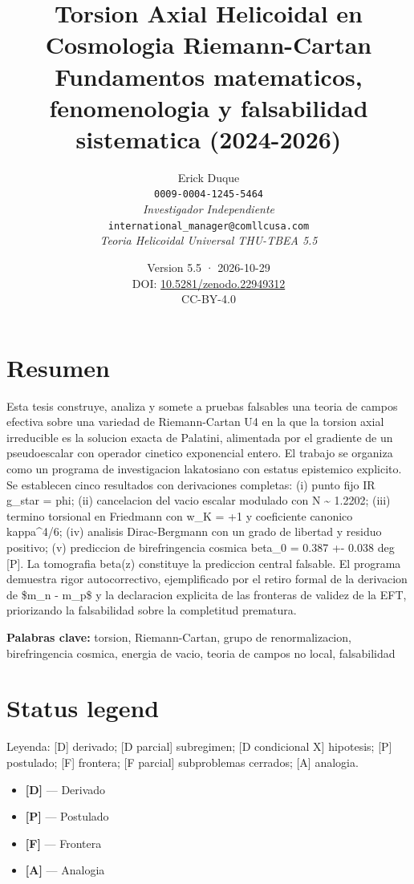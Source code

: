 ﻿\documentclass[11pt,letterpaper]{article}
\title{\textbf{Torsion Axial Helicoidal en Cosmologia Riemann-Cartan} \\[0.5em] \large Fundamentos matematicos, fenomenologia y falsabilidad sistematica (2024-2026)}
\author{Erick Duque \\ \texttt{0009-0004-1245-5464} \\ \textit{Investigador Independiente} \\ \texttt{international\_manager@comllcusa.com} \\ \textit{Teoria Helicoidal Universal THU-TBEA 5.5}}
\date{Version 5.5 · 2026-10-29 \\ \small DOI: \href{https://doi.org/10.5281/zenodo.22949312}{10.5281/zenodo.22949312} \\ \small CC-BY-4.0}
\begin{document}
\maketitle
\thispagestyle{empty}

\section*{Resumen}

Esta tesis construye, analiza y somete a pruebas falsables una teoria de campos efectiva sobre una variedad de Riemann-Cartan U4 en la que la torsion axial irreducible es la solucion exacta de Palatini, alimentada por el gradiente de un pseudoescalar con operador cinetico exponencial entero. El trabajo se organiza como un programa de investigacion lakatosiano con estatus epistemico explicito. Se establecen cinco resultados con derivaciones completas: (i) punto fijo IR g\_star = phi; (ii) cancelacion del vacio escalar modulado con N \textasciitilde{} 1.2202; (iii) termino torsional en Friedmann con w\_K = +1 y coeficiente canonico kappa\textasciicircum{}4/6; (iv) analisis Dirac-Bergmann con un grado de libertad y residuo positivo; (v) prediccion de birefringencia cosmica beta\_0 = 0.387 +- 0.038 deg [P]. La tomografia beta(z) constituye la prediccion central falsable. El programa demuestra rigor autocorrectivo, ejemplificado por el retiro formal de la derivacion de \$m\_n - m\_p\$ y la declaracion explicita de las fronteras de validez de la EFT, priorizando la falsabilidad sobre la completitud prematura.

\vspace{1em}
\textbf{Palabras clave:} torsion, Riemann-Cartan, grupo de renormalizacion, birefringencia cosmica, energia de vacio, teoria de campos no local, falsabilidad

\newpage
\tableofcontents
\newpage

\section*{Status legend}
Leyenda: [D] derivado; [D parcial] subregimen; [D condicional X] hipotesis; [P] postulado; [F] frontera; [F parcial] subproblemas cerrados; [A] analogia.

\vspace{0.5em}
\begin{itemize}[leftmargin=*]
\item \textcolor{Dgreen}{\textbf{[D]}} — Derivado
\item \textcolor{Ppurple}{\textbf{[P]}} — Postulado
\item \textcolor{Forange}{\textbf{[F]}} — Frontera
\item \textcolor{Ayellow}{\textbf{[A]}} — Analogia
\end{itemize}
\end{document}

